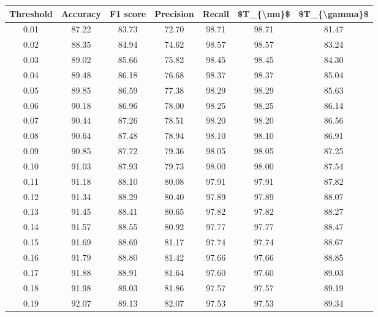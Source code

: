 \begin{tabular}{|c|c|c|c|c|c|c|}
\hline
 Threshold &  Accuracy &  F1 score &  Precision &  Recall &  \$T\_\{\textbackslash mu\}\$ &  \$T\_\{\textbackslash gamma\}\$ \\
\hline
      0.01 &     87.22 &     83.73 &      72.70 &   98.71 &      98.71 &         81.47 \\
      0.02 &     88.35 &     84.94 &      74.62 &   98.57 &      98.57 &         83.24 \\
      0.03 &     89.02 &     85.66 &      75.82 &   98.45 &      98.45 &         84.30 \\
      0.04 &     89.48 &     86.18 &      76.68 &   98.37 &      98.37 &         85.04 \\
      0.05 &     89.85 &     86.59 &      77.38 &   98.29 &      98.29 &         85.63 \\
      0.06 &     90.18 &     86.96 &      78.00 &   98.25 &      98.25 &         86.14 \\
      0.07 &     90.44 &     87.26 &      78.51 &   98.20 &      98.20 &         86.56 \\
      0.08 &     90.64 &     87.48 &      78.94 &   98.10 &      98.10 &         86.91 \\
      0.09 &     90.85 &     87.72 &      79.36 &   98.05 &      98.05 &         87.25 \\
      0.10 &     91.03 &     87.93 &      79.73 &   98.00 &      98.00 &         87.54 \\
      0.11 &     91.18 &     88.10 &      80.08 &   97.91 &      97.91 &         87.82 \\
      0.12 &     91.34 &     88.29 &      80.40 &   97.89 &      97.89 &         88.07 \\
      0.13 &     91.45 &     88.41 &      80.65 &   97.82 &      97.82 &         88.27 \\
      0.14 &     91.57 &     88.55 &      80.92 &   97.77 &      97.77 &         88.47 \\
      0.15 &     91.69 &     88.69 &      81.17 &   97.74 &      97.74 &         88.67 \\
      0.16 &     91.79 &     88.80 &      81.42 &   97.66 &      97.66 &         88.85 \\
      0.17 &     91.88 &     88.91 &      81.64 &   97.60 &      97.60 &         89.03 \\
      0.18 &     91.98 &     89.03 &      81.86 &   97.57 &      97.57 &         89.19 \\
      0.19 &     92.07 &     89.13 &      82.07 &   97.53 &      97.53 &         89.34 \\

\end{tabular}
